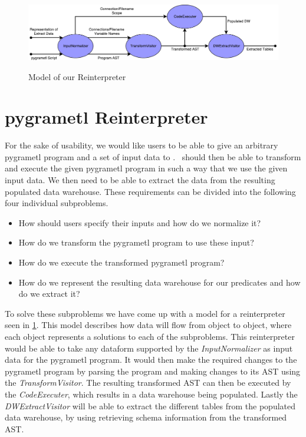 \begin{figure}
  \centering
  \includegraphics[width=1\textwidth]{figures/reinterpreter_model.pdf}
  \label{fig:reinterpreter}
  \caption{Model of our Reinterpreter}
\end{figure}

\section{pygrametl Reinterpreter}
For the sake of usability, we would like users to be able to give an arbitrary pygrametl program and a set of input data to \FW. \FW~should then be able to transform and execute the given pygrametl program in such a way that we use the given input data. We then need to be able to extract the data from the resulting populated data warehouse. These requirements can be divided into the following four individual subproblems.

\begin{itemize}
\item How should users specify their inputs and how do we normalize it?
\item How do we transform the pygrametl program to use these input?
\item How do we execute the transformed pygrametl program?
\item How do we represent the resulting data warehouse for our predicates and how do we extract it?
\end{itemize}

To solve these subproblems we have come up with a model for a reinterpreter seen in \cref{fig:reinterpreter}. This model describes how data will flow from object to object, where each object represents a solutions to each of the subproblems. This reinterpreter would be able to take any dataform supported by the \textit{InputNormalizer} as input data for the pygrametl program. It would then make the required changes to the pygrametl program by parsing the program and making changes to its AST using the \textit{TransformVisitor}. The resulting transformed AST can then be executed by the \textit{CodeExecuter}, which results in a data warehouse being populated. Lastly the \textit{DWExtractVisitor} will be able to extract the different tables from the populated data warehouse, by using retrieving schema information from the transformed AST.

